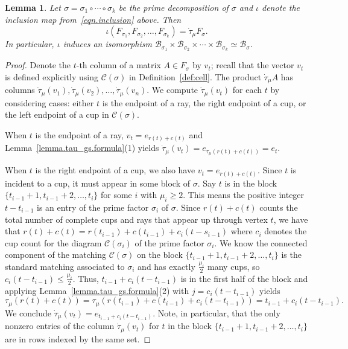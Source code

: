 \documentclass[11pt]{amsart}
\newtheorem{lemma}[theorem]{Lemma}
\theoremstyle{remark}
\theoremstyle{remark}
\theoremstyle{definition}
\theoremstyle{definition}
\theoremstyle{definition}
\numberwithin{equation}{section}
\newcommand{\gs}{\sigma}
\newcommand{\cc}{\mathcal{C}}
\newcommand{\SF}{\mathcal{B}}
\newcommand{\cupsigma}{\cc(\gs)}
\newcommand{\cell}{F_\gs}
\newcommand{\parsum}{t}
\begin{document}
\begin{lemma}\label{lem.taushift} Let $\gs=\gs_1\circ \cdots \circ \gs_k$ be the prime decomposition of $\gs$ and $\iota$ denote the inclusion map from~\eqref{eqn.inclusion} above. Then
\[
\iota(F_{\gs_1}, F_{\gs_2}, \ldots,F_{\gs_k} ) = \dot\tau_\mu \cell.
\]  
In particular, $\iota$ induces an isomorphism $\SF_{\gs_1}\times \SF_{\gs_2}\times \cdots \times \SF_{\gs_k}\simeq \SF_\gs $.
\end{lemma}
\begin{proof} Denote the $t$-th column of a matrix $A\in \cell$ by $v_t$; recall that the vector $v_t$ is defined explicitly using $\cupsigma$ in Definition~\ref{def:cell}. The product $\dot\tau_\mu A$ has columns $\dot\tau_\mu(v_1), \dot\tau_\mu(v_2), \ldots, \dot\tau_\mu(v_n)$. We compute $\dot\tau_\mu(v_t)$ for each $t$ by considering cases: either $t$ is the endpoint of a ray, the right endpoint of a cup, or the left endpoint of a cup in $\cupsigma$. 

When $t$ is the endpoint of a ray, $v_t = e_{r(t)+c(t)}$ and Lemma~\ref{lemma.tau_gs.formula}(1) yields $\dot\tau_\mu(v_t) = e_{\tau_\mu(r(t)+c(t))} = e_t$. 

When $t$ is the right endpoint of a cup, we also have $v_t = e_{r(t)+c(t)}$. Since $t$ is incident to a cup, it must appear in some block of $\gs$. Say $t$ is in the block $\{\parsum_{i-1}+1, \parsum_{i-1}+2, \ldots, \parsum_i\}$ for some $i$ with $\mu_i\geq 2$. This means the positive integer $t-\parsum_{i-1}$ is an entry of the prime factor $\gs_i$ of $\gs$. Since $r(t)+c(t)$ counts the total number of complete cups and rays that appear up through vertex $t$, we have that $r(t)+c(t) = r(\parsum_{i-1})+c(\parsum_{i-1})+c_i(t-s_{i-1})$ where $c_i$ denotes the cup count for the diagram $\cc(\gs_i)$ of the prime factor $\gs_i$. We know the connected component of the matching $\cupsigma$ on the block $\{\parsum_{i-1}+1, \parsum_{i-1}+2, \ldots, \parsum_i\}$ is the standard matching associated to $\gs_i$ and has exactly $\frac{\mu_i}{2}$ many cups, so $c_i(t-\parsum_{i-1}) \leq \frac{\mu_i}{2}$. Thus, $\parsum_{i-1}+c_i(t-\parsum_{i-1})$ is in the first half of the block and applying Lemma~\ref{lemma.tau_gs.formula}(2) with $j=c_i(t-\parsum_{i-1})$ yields 
\[
\tau_\mu(r(t)+c(t)) = \tau_\mu(r(\parsum_{i-1})+c(\parsum_{i-1})+c_i(t-\parsum_{i-1})) = \parsum_{i-1}+c_i(t-\parsum_{i-1}).
\]
We conclude $\dot\tau_\mu(v_t) = e_{\parsum_{i-1}+c_i(t-\parsum_{i-1})}$. Note, in particular, that the only nonzero entries of the column $\dot\tau_\mu (v_t)$ for $t$ in the block $\{\parsum_{i-1}+1, \parsum_{i-1}+2, \ldots, \parsum_i\}$ are in rows indexed by the same set.


\end{proof}
\end{document}

